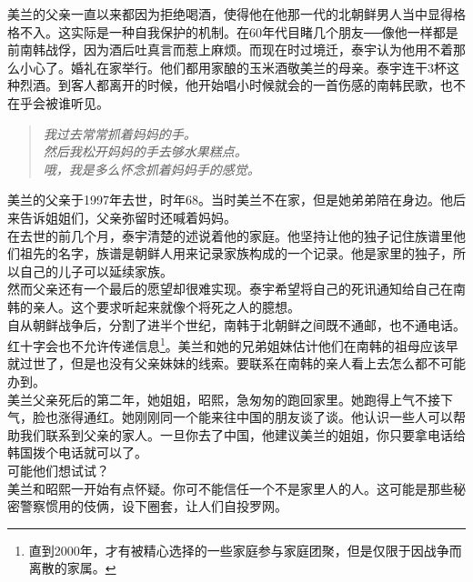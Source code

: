美兰的父亲一直以来都因为拒绝喝酒，使得他在他那一代的北朝鲜男人当中显得格格不入。这实际是一种自我保护的机制。在60年代目睹几个朋友──像他一样都是前南韩战俘，因为酒后吐真言而惹上麻烦。而现在时过境迁，泰宇认为他用不着那么小心了。婚礼在家举行。他们都用家酿的玉米酒敬美兰的母亲。泰宇连干3杯这种烈酒。到客人都离开的时候，他开始唱小时候就会的一首伤感的南韩民歌，也不在乎会被谁听见。\\

\begin{quote}
	\begin{spacing}{1.0}  %
		\textit{{\footnotesize 	我过去常常抓着妈妈的手。\\
		然后我松开妈妈的手去够水果糕点。\\
		哦，我是多么怀念抓着妈妈手的感觉。\\}}
	\end{spacing}
\end{quote}

美兰的父亲于1997年去世，时年68。当时美兰不在家，但是她弟弟陪在身边。他后来告诉姐姐们，父亲弥留时还喊着妈妈。\\

在去世的前几个月，泰宇清楚的述说着他的家庭。他坚持让他的独子记住族谱里他们祖先的名字，族谱是朝鲜人用来记录家族构成的一个记录。他是家里的独子，所以自己的儿子可以延续家族。\\

然而父亲还有一个最后的愿望却很难实现。泰宇希望将自己的死讯通知给自己在南韩的亲人。这个要求听起来就像个将死之人的臆想。\\

自从朝鲜战争后，分割了进半个世纪，南韩于北朝鲜之间既不通邮，也不通电话。红十字会也不允许传递信息\footnote{直到2000年，才有被精心选择的一些家庭参与家庭团聚，但是仅限于因战争而离散的家属。}。美兰和她的兄弟姐妹估计他们在南韩的祖母应该早就过世了，但是也没有父亲妹妹的线索。要联系在南韩的亲人看上去怎么都不可能办到。\\

美兰父亲死后的第二年，她姐姐，昭熙，急匆匆的跑回家里。她跑得上气不接下气，脸也涨得通红。她刚刚同一个能来往中国的朋友谈了谈。他认识一些人可以帮助我们联系到父亲的家人。一旦你去了中国，他建议美兰的姐姐，你只要拿电话给韩国拨个电话就可以了。\\

可能他们想试试？\\

美兰和昭熙一开始有点怀疑。你可不能信任一个不是家里人的人。这可能是那些秘密警察惯用的伎俩，设下圈套，让人们自投罗网。\\

